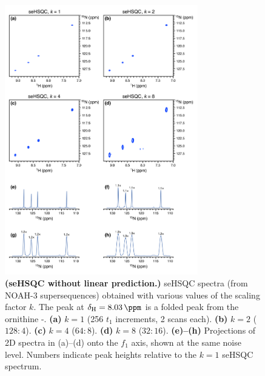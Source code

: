 \begin{figure}
    \centering
    \includegraphics[width=0.75\textwidth]{./figures/spv2_kscale.png}
    \caption{
        \textbf{(seHSQC without linear prediction.)}
        \nitrogen{} seHSQC spectra (from NOAH-3  supersequences) obtained with various values of the scaling factor $k$.
        The peak at $\delta_{\ce{H}} = \SI{8.03}{\ppm}$ is a folded peak from the ornithine \textdelta-.
        \textbf{(a)} $k = 1$ (256 $t_1$ increments, 2 scans each).
        \textbf{(b)} $k = 2$ ($128:4$).
        \textbf{(c)} $k = 4$ ($64:8$).
        \textbf{(d)} $k = 8$ ($32:16$).
        \textbf{(e)--(h)} Projections of 2D spectra in (a)--(d) onto the $f_1$ axis, shown at the same noise level.
        Numbers indicate peak heights relative to the $k = 1$ seHSQC spectrum.
        \grami{}
    }
    \label{fig:spv2_kscale}
\end{figure}

